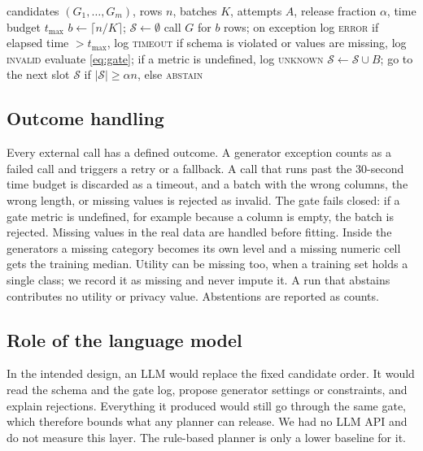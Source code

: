 \documentclass[journal]{IEEEtran}
\begin{document}
\begin{algorithm}[!t]
\caption{Gated orchestration of one synthetic-data request}
\label{alg:orch}
\begin{algorithmic}[1]
\small
\Require candidates $(G_1,\dots,G_m)$, rows $n$, batches $K$, attempts $A$, release fraction $\alpha$, time budget $t_{\max}$
\State $b\gets\lceil n/K\rceil$; $\mathcal{S}\gets\emptyset$
    \State call $G$ for $b$ rows; on exception log \textsc{error}
    \State if elapsed time $>t_{\max}$, log \textsc{timeout}
    \State if schema is violated or values are missing, log \textsc{invalid}
    \State evaluate \eqref{eq:gate}; if a metric is undefined, log \textsc{unknown}
      \State $\mathcal{S}\gets\mathcal{S}\cup B$; go to the next slot
    \EndIf
  \EndFor
\EndFor
\State \Return $\mathcal{S}$ if $|\mathcal{S}|\ge\alpha n$, else \textsc{abstain}
\end{algorithmic}
\end{algorithm}

\subsection{Outcome handling}
Every external call has a defined outcome. A generator exception counts as a failed call and triggers a retry or a fallback. A call that runs past the 30-second time budget is discarded as a timeout, and a batch with the wrong columns, the wrong length, or missing values is rejected as invalid. The gate fails closed: if a gate metric is undefined, for example because a column is empty, the batch is rejected. Missing values in the real data are handled before fitting. Inside the generators a missing category becomes its own level and a missing numeric cell gets the training median. Utility can be missing too, when a training set holds a single class; we record it as missing and never impute it. A run that abstains contributes no utility or privacy value. Abstentions are reported as counts.

\subsection{Role of the language model}
In the intended design, an LLM would replace the fixed candidate order. It would read the schema and the gate log, propose generator settings or constraints, and explain rejections. Everything it produced would still go through the same gate, which therefore bounds what any planner can release. We had no LLM API and do not measure this layer. The rule-based planner is only a lower baseline for it.
\end{document}

